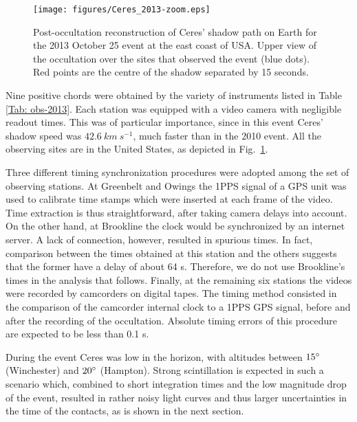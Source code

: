 \documentclass[useAMS,usenatbib]{mn2e}
\begin{document}
\begin{figure}
{\texttt{[image: figures/Ceres\_2013-zoom.eps]}}
\caption{Post-occultation reconstruction of Ceres' shadow path on Earth for the 2013 October 25 event at the east coast of USA. 
Upper view of the occultation over the sites that observed the event (blue dots). Red points are the centre of the shadow separated by 15 seconds.
\label{Fig: Ceres-2013-map}}
\end{figure}

Nine positive chords were obtained by the variety of instruments listed in Table \ref{Tab: obs-2013}. Each station was equipped with a video camera with negligible readout times. This was of particular importance, since in this event Ceres' shadow speed was $42.6~ km~s^{-1}$, much faster than in the 2010 event. All the observing sites are in the United States, as depicted in Fig.~\ref{Fig: Ceres-2013-map}.

Three different timing synchronization procedures were adopted among the set of observing stations. At Greenbelt and Owings the 1PPS signal of a GPS unit was used to calibrate time stamps which were inserted at each frame of the video. Time extraction is thus straightforward, after taking camera delays into account. On the other hand, at Brookline the clock would be synchronized by an internet server. A lack of connection, however, resulted in spurious times. In fact, comparison between the times obtained at this station and the others suggests that the former have a delay of about 64 s. Therefore, we do not use Brookline's %
times in the analysis that follows. Finally, at the remaining six stations the videos were recorded by camcorders on digital tapes. The timing method consisted in the comparison of the camcorder internal clock to a 1PPS GPS signal, before and after the recording of the occultation. Absolute timing errors of this procedure are expected to be less than 0.1 s.

During the event Ceres was low in the horizon, with altitudes between $15\hbox{$^\circ$}$ (Winchester) and $20\hbox{$^\circ$}$ (Hampton). Strong scintillation is expected in such a scenario which, combined to short integration times and the low magnitude drop of the event, resulted in rather noisy light curves and thus larger uncertainties in the time of the contacts, as is shown in the next section.
\end{document}
